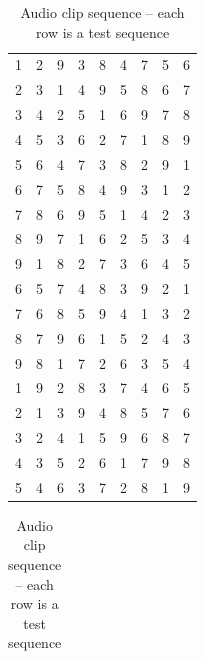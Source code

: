 \begin{table}
  \parbox{.45\linewidth}{
    \centering
    \begin{tabular}{rrrrrrrrr}

      1 & 2 & 9 & 3 & 8 & 4 & 7 & 5 & 6 \\ 
      2 & 3 & 1 & 4 & 9 & 5 & 8 & 6 & 7 \\ 
      3 & 4 & 2 & 5 & 1 & 6 & 9 & 7 & 8 \\ 
      4 & 5 & 3 & 6 & 2 & 7 & 1 & 8 & 9 \\ 
      5 & 6 & 4 & 7 & 3 & 8 & 2 & 9 & 1 \\ 
      6 & 7 & 5 & 8 & 4 & 9 & 3 & 1 & 2 \\ 
      7 & 8 & 6 & 9 & 5 & 1 & 4 & 2 & 3 \\ 
      8 & 9 & 7 & 1 & 6 & 2 & 5 & 3 & 4 \\ 
      9 & 1 & 8 & 2 & 7 & 3 & 6 & 4 & 5 \\ 
      6 & 5 & 7 & 4 & 8 & 3 & 9 & 2 & 1 \\ 
      7 & 6 & 8 & 5 & 9 & 4 & 1 & 3 & 2 \\ 
      8 & 7 & 9 & 6 & 1 & 5 & 2 & 4 & 3 \\ 
      9 & 8 & 1 & 7 & 2 & 6 & 3 & 5 & 4 \\ 
      1 & 9 & 2 & 8 & 3 & 7 & 4 & 6 & 5 \\ 
      2 & 1 & 3 & 9 & 4 & 8 & 5 & 7 & 6 \\ 
      3 & 2 & 4 & 1 & 5 & 9 & 6 & 8 & 7 \\ 
      4 & 3 & 5 & 2 & 6 & 1 & 7 & 9 & 8 \\ 
      5 & 4 & 6 & 3 & 7 & 2 & 8 & 1 & 9 \\ 
    \end{tabular}
    \caption{Audio clip sequence -- each row is a test sequence}
    \label{tab:clipseq}
  }
  \hfill
  \parbox{.45\linewidth}{
    \centering
    \begin{tabular}{rrrrrrrrr}


\end{tabular}}
\end{table}
